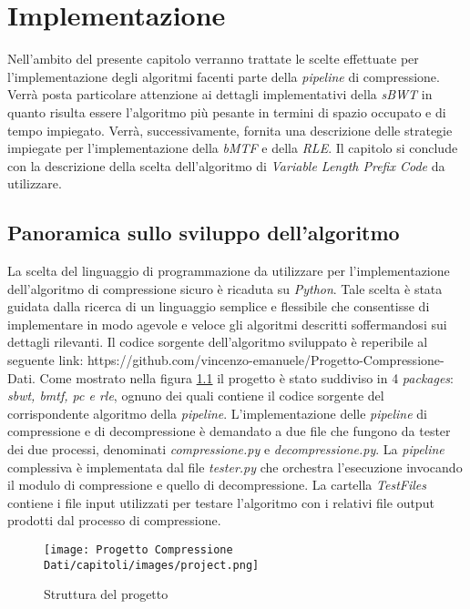 \chapter{Implementazione} %
%

\begin{citazione}
Nell'ambito del presente capitolo verranno trattate le scelte effettuate per l'implementazione degli algoritmi facenti parte della \emph{pipeline} di compressione. Verrà posta particolare attenzione ai dettagli implementativi della \emph{sBWT} in quanto risulta essere l'algoritmo più pesante in termini di spazio occupato e di tempo impiegato. Verrà, successivamente, fornita una descrizione delle strategie impiegate per l'implementazione della \emph{bMTF} e della \emph{RLE}. Il capitolo si conclude con la descrizione della scelta dell'algoritmo di \emph{Variable Length Prefix Code} da utilizzare. 
\end{citazione}
\newpage

\section{Panoramica sullo sviluppo dell'algoritmo} 
La scelta del linguaggio di programmazione da utilizzare per l'implementazione dell'algoritmo di compressione sicuro è ricaduta su \emph{Python}. Tale scelta è stata guidata dalla ricerca di un linguaggio semplice e flessibile che consentisse di implementare in modo agevole e veloce gli algoritmi descritti soffermandosi sui dettagli rilevanti. Il codice sorgente dell'algoritmo sviluppato è reperibile al seguente link: https://github.com/vincenzo-emanuele/Progetto-Compressione-Dati. Come mostrato nella figura \ref{fig:project} il progetto è stato suddiviso in 4 \emph{packages}: \emph{sbwt, bmtf, pc e rle}, ognuno dei quali contiene il codice sorgente del corrispondente algoritmo della \emph{pipeline}. L'implementazione delle \emph{pipeline} di compressione e di decompressione è demandato a due file che fungono da tester dei due processi, denominati \emph{compressione.py} e \emph{decompressione.py}. La \emph{pipeline} complessiva è implementata dal file \emph{tester.py} che orchestra l'esecuzione invocando il modulo di compressione e quello di decompressione. La cartella \emph{TestFiles} contiene i file input utilizzati per testare l'algoritmo con i relativi file output prodotti dal processo di compressione.
\begin{figure}[h]
    \centering
    \texttt{[image: Progetto Compressione Dati/capitoli/images/project.png]}
\caption{Struttura del progetto}
    \label{fig:project}
\end{figure} \\
